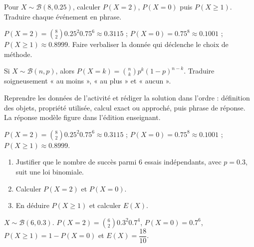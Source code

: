 \begin{activity}
Pour $X\sim\mathcal B(8,\num{0,25})$, calculer $P(X=2)$, $P(X=0)$ puis $P(X\geq1)$. Traduire chaque événement en phrase.
\begin{center}\end{center}
\end{activity}
\begin{solution}$P(X=2)=\binom82 \num{0,25}^2 \num{0,75}^6\approx\num{0,3115}$ ; $P(X=0)=\num{0,75}^8\approx\num{0,1001}$ ; $P(X\geq1)\approx\num{0,8999}$. Faire verbaliser la donnée qui déclenche le choix de méthode.\end{solution}

\begin{summary}Si $X\sim\mathcal B(n,p)$, alors $P(X=k)=\binom nkp^k(1-p)^{n-k}$. Traduire soigneusement « au moins », « au plus » et « aucun ».\end{summary}

\begin{example}
Reprendre les données de l'activité et rédiger la solution dans l'ordre : définition des objets, propriété utilisée, calcul exact ou approché, puis phrase de réponse. La réponse modèle figure dans l'édition enseignant.
\end{example}
\begin{solution}$P(X=2)=\binom82 \num{0,25}^2 \num{0,75}^6\approx\num{0,3115}$ ; $P(X=0)=\num{0,75}^8\approx\num{0,1001}$ ; $P(X\geq1)\approx\num{0,8999}$.\end{solution}

\begin{exercise}[essentiel]
\begin{enumerate}\item Justifier que le nombre de succès parmi $6$ essais indépendants, avec $p=\num{0,3}$, suit une loi binomiale.\item Calculer $P(X=2)$ et $P(X=0)$.\item En déduire $P(X\geq1)$ et calculer $E(X)$.\end{enumerate}
\end{exercise}
\begin{solution}$X\sim\mathcal B(6,\num{0,3})$. $P(X=2)=\binom{6}2 \num{0,3}^2 \num{0,7}^{4}$, $P(X=0)=\num{0,7}^{6}$, $P(X\geq1)=1-P(X=0)$ et $E(X)=\dfrac{18}{10}$.\end{solution}

